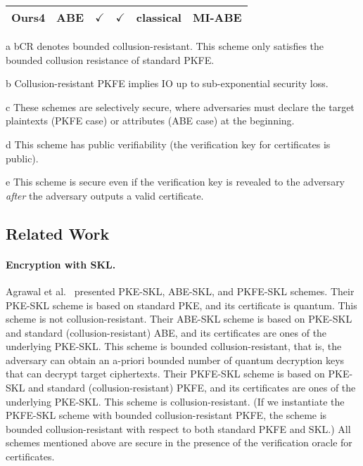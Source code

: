 \begin{table*}[!t]
\begin{center}
\begin{minipage}[c]{\textwidth}
\begin{center}
\begin{threeparttable}
\begin{tabular}{rccccc}
  Ours4 & ABE\tnote{c} & \colorbox[rgb]{1,0.9,0}{$\checkmark$}  & \colorbox[rgb]{1,0.9,0}{$\checkmark$} & \colorbox[rgb]{1,0.9,0}{classical} & MI-ABE\\  
\bottomrule
\end{tabular}
 \begin{tablenotes} %
 \item[a] bCR denotes bounded collusion-resistant. This scheme only satisfies the bounded collusion resistance of standard PKFE.
 \item[b] Collusion-resistant PKFE implies IO up to sub-exponential security loss.
 \item[c] These schemes are selectively secure, where adversaries must
     declare the target plaintexts (PKFE case) or attributes (ABE case) at the beginning.
 \item[d] This scheme has public verifiability (the verification key for certificates is public).
 \item[e] This scheme is secure even if the verification key is revealed to the adversary \emph{after} the adversary outputs a valid certificate.
 \end{tablenotes}
 \end{threeparttable}
\end{center}
\end{minipage}
\end{center}
\end{table*}


% 

\subsection{Related Work}\label{sec:related_work}
\paragraph{Encryption with SKL.}
Agrawal et al.~\cite{EC:AKNYY23} presented PKE-SKL, ABE-SKL, and PKFE-SKL schemes.
Their PKE-SKL scheme is based on standard PKE, and its certificate is quantum. This scheme is not collusion-resistant.
Their ABE-SKL scheme is based on PKE-SKL and standard (collusion-resistant) ABE, and its certificates are ones of the underlying PKE-SKL.
This scheme is bounded collusion-resistant, that is, the adversary can
obtain an a-priori bounded number of quantum decryption keys that can decrypt target ciphertexts.
Their PKFE-SKL scheme is based on PKE-SKL and standard (collusion-resistant) PKFE, and its certificates are ones of the underlying PKE-SKL.
This scheme is collusion-resistant. (If we instantiate the PKFE-SKL scheme with bounded collusion-resistant PKFE, the scheme is bounded collusion-resistant with respect to both standard PKFE and SKL.)
All schemes mentioned above are secure in the presence of the verification oracle for certificates.

